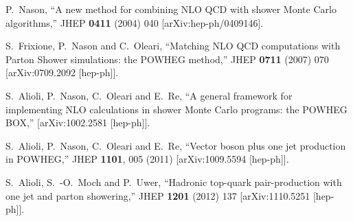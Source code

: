 \documentclass[paper]{JHEP3}
\begin{document}
\begin{thebibliography}{10}

  P.~Nason,
  ``A new method for combining NLO QCD with shower Monte Carlo algorithms,''
  JHEP {\bf 0411} (2004) 040
  [arXiv:hep-ph/0409146].

  S.~Frixione, P.~Nason and C.~Oleari,
``Matching NLO QCD computations with Parton Shower simulations: the POWHEG
method,''
  JHEP {\bf 0711} (2007) 070
  [arXiv:0709.2092 [hep-ph]].

  S.~Alioli, P.~Nason, C.~Oleari and E.~Re,
``A general framework for implementing NLO calculations in shower Monte Carlo
  programs: the POWHEG BOX,''
  [arXiv:1002.2581 [hep-ph]].

 S.~Alioli, P.~Nason, C.~Oleari and E.~Re,
  ``Vector boson plus one jet production in POWHEG,''
  JHEP {\bf 1101}, 005 (2011)
  [arXiv:1009.5594 [hep-ph]].

  S.~Alioli, S.~-O.~Moch and P.~Uwer,
  ``Hadronic top-quark pair-production with one jet and parton showering,''
  JHEP {\bf 1201} (2012) 137
  [arXiv:1110.5251 [hep-ph]].
\end{thebibliography}
\end{document}
